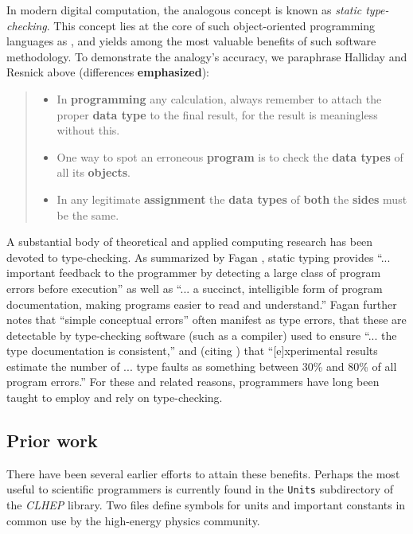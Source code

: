 In modern digital computation,
the analogous concept is known as {\it static type-checking}.
This concept lies at the core
of such object-oriented programming languages as \cpp,
and yields among the most valuable benefits
of such software methodology.
To demonstrate the analogy's accuracy,
we paraphrase Halliday and Resnick above (differences {\bf emphasized}):
\begin{quote}
\begin{itemize}
  \item
    In {\bf programming} any calculation,
    always remember to attach the proper {\bf data type} to the final result,
    for the result is meaningless without this.
  \item
    One way to spot an erroneous {\bf program}
    is to check the {\bf data types} of all its {\bf objects}.
  \item
    In any legitimate {\bf assignment}
    the {\bf data types} of {\bf both} the {\bf sides} must be the same.
\end{itemize}
\end{quote}

A substantial body of theoretical and applied computing research
has been devoted to type-checking.
As summarized by Fagan \cite[pp. ii, 2]{Fagan}, static typing provides
    ``... important feedback to the programmer
    by detecting a large class of program errors before execution''
as well as
    ``... a succinct, intelligible form of program documentation,
    making programs easier to read and understand.''
Fagan further notes that
  ``simple conceptual errors''
often manifest as type errors,
that these are detectable by type-checking software
(such as a compiler)
used to ensure
  ``... the type documentation is consistent,''
and (citing \cite{Gannon}) that
  ``[e]xperimental results estimate the number of ... type faults
  as something between 30\% and 80\% of all program errors.''
For these and related reasons,
programmers have long been taught to employ
and rely on type-checking.

\subsection{ Prior work }

There have been several earlier efforts
to attain these benefits.
Perhaps the most useful to scientific programmers
is currently found in the {\tt Units} subdirectory
of the {\it CLHEP} library.
Two files \cite{Maire1, Maire2}
define symbols for units and important constants
in common use by the high-energy physics community.


